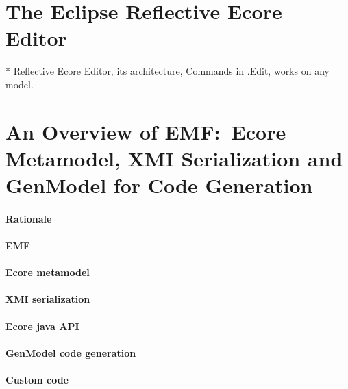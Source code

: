 \section{The Eclipse Reflective Ecore Editor}

* Reflective Ecore Editor, its architecture, Commands in .Edit, works on any model.

\section{An Overview of EMF:\ Ecore Metamodel, XMI Serialization and GenModel for Code Generation}\label{sec:emf-metamodel}

\paragraph{Rationale}

\paragraph{\acrlong{EMF}}

\paragraph{Ecore metamodel}

\paragraph{\Acrshort{XMI} serialization}

\paragraph{Ecore java \acrshort{API}}

\paragraph{GenModel code generation}

\paragraph{Custom code}


